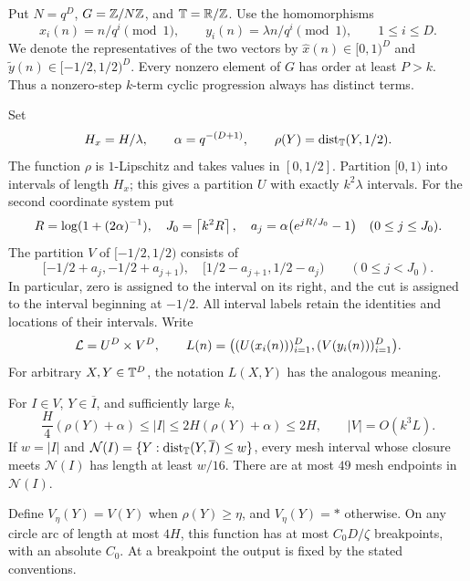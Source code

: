 Put \(N=q^D\), \(G=\mathbb Z/N\mathbb Z\), and \(\mathbb T=\mathbb R/\mathbb Z\). Use the homomorphisms
\begin{equation}\label{eq:coordinates}
 x_i(n)=n/q^i\pmod1,\qquad
 y_i(n)=\lambda n/q^i\pmod1,\qquad 1\le i\le D.
\end{equation}
We denote the representatives of the two vectors by
\(\widehat{x}(n)\in[0,1)^D\) and
\(\widetilde{y}(n)\in[-1/2,1/2)^D\).
Every nonzero element of \(G\) has order at least \(P>k\).
Thus a nonzero-step \(k\)-term cyclic progression always has distinct
terms.

Set
\[
 H_x=H/\lambda,\qquad \alpha=q^{-(D+1)},\qquad
 \rho(Y)=\operatorname{dist}_\mathbb T(Y,1/2).
\]
The function \(\rho\) is \(1\)-Lipschitz and takes values in
\([0,1/2]\).
Partition \([0,1)\) into intervals of length \(H_x\); this gives a
partition \(U\) with exactly \(k^2\lambda\) intervals.
For the second coordinate system put
\begin{equation}\label{eq:adaptive-mesh}
 R=\log(1+(2\alpha)^{-1}),\quad
 J_0=\left\lceil k^2R\right\rceil,\quad
 a_j=\alpha\bigl(e^{jR/J_0}-1\bigr)\quad(0\le j\le J_0).
\end{equation}
The partition \(V\) of \([-1/2,1/2)\) consists of
\[
 [-1/2+a_j,-1/2+a_{j+1}),\quad
 [1/2-a_{j+1},1/2-a_j)
 \qquad(0\le j<J_0).
\]
In particular, zero is assigned to the interval on its right, and the
cut is assigned to the interval beginning at \(-1/2\).
All interval labels retain the identities and locations of their
intervals. Write
\begin{equation}\label{eq:labels}
 \mathcal L=U^D\times V^D,\qquad
 L(n)=\bigl((U(x_i(n)))_{i=1}^D,(V(y_i(n)))_{i=1}^D\bigr).
\end{equation}
For arbitrary \(X,Y\in\mathbb T^D\), the notation \(L(X,Y)\) has the analogous
meaning.

\begin{lemma}\label{lem:mesh}
For \(I\in V\), \(Y\in\overline I\), and sufficiently large \(k\),
\begin{equation}\label{eq:mesh-width}
 \frac H4(\rho(Y)+\alpha)\le |I|
 \le2H(\rho(Y)+\alpha)\le2H,\qquad |V|=O(k^3L).
\end{equation}
If \(w=|I|\) and
\(\mathcal N(I)=\{Y:\operatorname{dist}_\mathbb T(Y,\overline I)\le w\}\), every
mesh interval whose closure meets \(\mathcal N(I)\) has length at
least \(w/16\). There are at most \(49\) mesh endpoints in
\(\mathcal N(I)\).

Define \(V_\eta(Y)=V(Y)\) when \(\rho(Y)\ge\eta\), and
\(V_\eta(Y)=*\) otherwise. On any circle arc of length at most \(4H\),
this function has at most \(C_0D/\zeta\) breakpoints, with an absolute
\(C_0\). At a breakpoint the output is fixed by the stated conventions.
\end{lemma}


